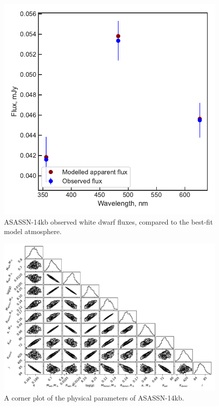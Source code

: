 \begin{figure}
    \centering
    \includegraphics[width=\textwidth]{figures/results/ASASSN-14kb/fluxplot.pdf}
    \caption{ASASSN-14kb observed white dwarf fluxes, compared to the best-fit model atmosphere.}
    \label{fig:ASASSN-14kb flux plot}
\end{figure}
\begin{figure}
    \includegraphics[height=\textwidth, angle=90]{figures/results/physicalparams_corners/ASASSN-14kb_physcorner.pdf}
    \caption{A corner plot of the physical parameters of ASASSN-14kb.}
\end{figure}
\clearpage



